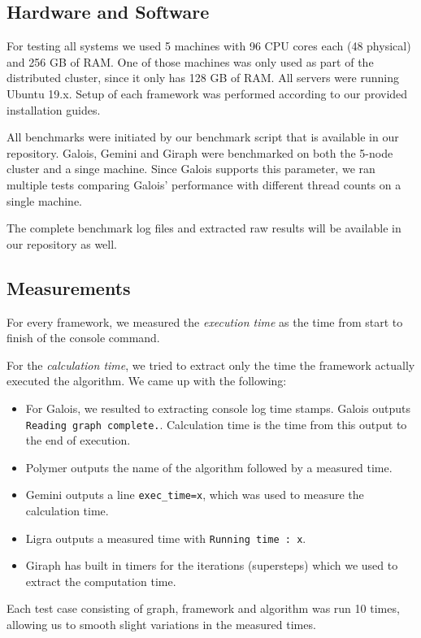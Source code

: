 
\subsection{Hardware and Software}
For testing all systems we used 5 machines with 96 CPU cores each (48 physical) and 256 GB of RAM. One of those machines was only used as part of the distributed cluster, since it only has 128 GB of RAM.
All servers were running Ubuntu 19.x.
Setup of each framework was performed according to our provided installation guides.

All benchmarks were initiated by our benchmark script that is available in our repository. Galois, Gemini and Giraph were benchmarked on both the 5-node cluster and a singe machine.
Since Galois supports this parameter, we ran multiple tests comparing Galois' performance with different thread counts on a single machine.

The complete benchmark log files and extracted raw results will be available in our repository as well.

\subsection{Measurements}
For every framework, we measured the \emph{execution time} as the time from start to finish of the console command.

For the \emph{calculation time}, we tried to extract only the time the framework actually executed the algorithm. We came up with the following:
\begin{itemize}
	\item For Galois, we resulted to extracting console log time stamps. Galois outputs \texttt{Reading graph complete.}. Calculation time is the time from this output to the end of execution.
	\item Polymer outputs the name of the algorithm followed by a measured time.
	\item Gemini outputs a line \texttt{exec\_time=x}, which was used to measure the calculation time. 
	\item Ligra outputs a measured time with \texttt{Running time : x}.
	\item Giraph has built in timers for the iterations (supersteps) which we used to extract the computation time.
\end{itemize}
Each test case consisting of graph, framework and algorithm was run 10 times, allowing us to smooth slight variations in the measured times.

